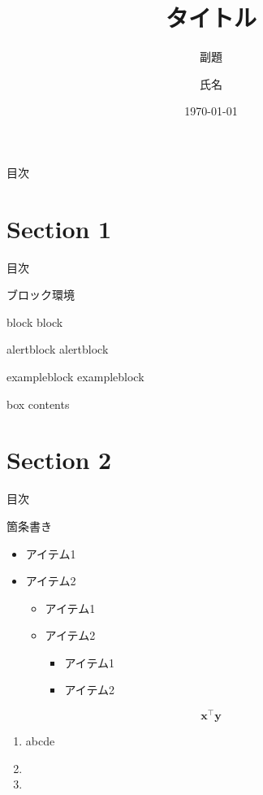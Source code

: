 \documentclass[aspectratio=169, dvipdfmx, 11pt,uplatex]{beamer} %
\title[Short title]{タイトル}
\subtitle{副題}
\author[著者略称]{氏名}
\institute[所属略称]{所属}
\date{\today}
\begin{document}
\maketitle

\begin{frame}{目次}
    \tableofcontents
\end{frame}

\section{Section 1}
\begin{frame}{目次}
    \tableofcontents[currentsection]
\end{frame}

\begin{frame}{ブロック環境}
    \begin{block}{block}
    block
    \end{block}
    \begin{alertblock}{alertblock}
    alertblock
    \end{alertblock}
    \begin{exampleblock}{exampleblock}
    exampleblock
    \end{exampleblock}
    \begin{tcolorbox}[colframe=green,
    colback=green!10!white,
    colbacktitle=green!40!white,
    coltitle=black, fonttitle=\bfseries,
    title=My box]
        box contents
    \end{tcolorbox}
\end{frame}

\section{Section 2}
\begin{frame}{目次}
    \tableofcontents[currentsection]
\end{frame}

\begin{frame}{箇条書き}
    \begin{itemize}
    \item アイテム1
    \item \alert{アイテム2}
        \begin{itemize}
        \item アイテム1
        \item \alert{アイテム2}
            \begin{itemize}
            \item アイテム1
            \item \alert{アイテム2}
            \end{itemize}
        \end{itemize}
    \end{itemize}
    \[
    \bm{x}^\top\bm{y}
    \]
    \begin{enumerate}
    \item abcde
    \item {}
    \item 
    \end{enumerate}
\end{frame}
\end{document}
